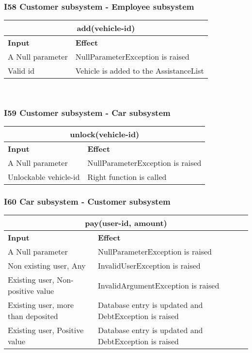 \subsubsection{I58 Customer subsystem - Employee subsystem}
\begin{tabular}{|p{5cm}|p{7cm}|}
\hline
\multicolumn{2}{|c|}{add(vehicle-id)} \\
\hline
\textbf{Input} & \textbf{Effect} \\

\hline
A Null parameter & NullParameterException is raised \\

\hline
Valid id & Vehicle is added to the AssistanceList \\
\hline
\end{tabular}
\\

\subsubsection{I59 Customer subsystem - Car subsystem}
\begin{tabular}{|p{5cm}|p{7cm}|}
\hline
\multicolumn{2}{|c|}{unlock(vehicle-id)}\\
\hline
\textbf{Input} & \textbf{Effect}\\

\hline
A Null parameter & NullParameterException is raised \\

\hline
Unlockable vehicle-id & Right function is called\\
\hline
\end{tabular}

\subsubsection{I60 Car subsystem - Customer subsystem}
\begin{tabular}{|p{5cm}|p{7cm}|}
\hline
\multicolumn{2}{|c|}{pay(user-id, amount)} \\
\hline
\textbf{Input} & \textbf{Effect} \\

\hline
A Null parameter & NullParameterException is raised \\

\hline
Non existing user, Any & InvalidUserException is raised \\

\hline
Existing user, Non-positive value & InvalidArgumentException is raised \\

\hline
Existing user, more than deposited & Database entry is updated and DebtException is raised \\

\hline
Existing user, Positive value & Database entry is updated and DebtException is raised \\
\hline
\end{tabular}

